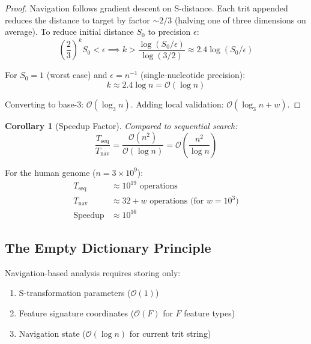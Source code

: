 \documentclass[twocolumn,10pt]{article}
\newtheorem{corollary}[theorem]{Corollary}
\theoremstyle{remark}
\newcommand{\bigO}{\mathcal{O}}
\begin{document}
\begin{proof}
Navigation follows gradient descent on S-distance. Each trit appended reduces the distance to target by factor $\sim 2/3$ (halving one of three dimensions on average). To reduce initial distance $S_0$ to precision $\epsilon$:
\begin{equation}
\left(\frac{2}{3}\right)^k S_0 < \epsilon \implies k > \frac{\log(S_0/\epsilon)}{\log(3/2)} \approx 2.4 \log(S_0/\epsilon)
\end{equation}

For $S_0 = 1$ (worst case) and $\epsilon = n^{-1}$ (single-nucleotide precision):
\begin{equation}
k \approx 2.4 \log n = \bigO(\log n)
\end{equation}

Converting to base-3: $\bigO(\log_3 n)$. Adding local validation: $\bigO(\log_3 n + w)$.
\end{proof}

\begin{corollary}[Speedup Factor]
Compared to sequential search:
\begin{equation}
\frac{T_{\text{seq}}}{T_{\text{nav}}} = \frac{\bigO(n^2)}{\bigO(\log n)} = \bigO\left(\frac{n^2}{\log n}\right)
\end{equation}
\end{corollary}

For the human genome ($n = 3 \times 10^9$):
\begin{align}
T_{\text{seq}} &\approx 10^{19} \text{ operations} \\
T_{\text{nav}} &\approx 32 + w \text{ operations (for } w = 10^3 \text{)} \\
\text{Speedup} &\approx 10^{16}
\end{align}

\subsection{The Empty Dictionary Principle}

Navigation-based analysis requires storing only:
\begin{enumerate}
\item S-transformation parameters ($\bigO(1)$)
\item Feature signature coordinates ($\bigO(F)$ for $F$ feature types)
\item Navigation state ($\bigO(\log n)$ for current trit string)
\end{enumerate}
\end{document}
